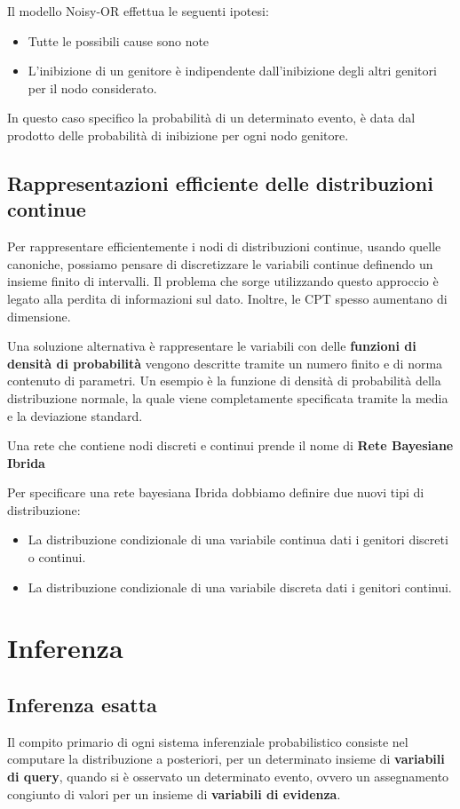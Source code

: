 Il modello Noisy-OR effettua le seguenti ipotesi:
\begin{itemize}
    \item Tutte le possibili cause sono note
    \item L'inibizione di un genitore è indipendente dall'inibizione degli altri
          genitori per il nodo considerato.
\end{itemize}
In questo caso specifico la probabilità di un determinato evento, è data dal
prodotto delle probabilità di inibizione per ogni nodo genitore.
\subsection{Rappresentazioni efficiente delle distribuzioni continue}
Per rappresentare efficientemente i nodi di distribuzioni continue, usando quelle
canoniche, possiamo pensare di discretizzare le variabili continue definendo un
insieme finito di intervalli. Il problema che sorge utilizzando questo approccio
è legato alla perdita di informazioni sul dato. Inoltre, le CPT spesso aumentano
di dimensione.

Una soluzione alternativa è rappresentare le variabili con delle \textbf{funzioni
    di densità di probabilità} vengono descritte tramite un numero finito e di
norma contenuto di parametri. Un esempio è la funzione di densità di probabilità
della distribuzione normale, la quale viene completamente specificata tramite
la media e la deviazione standard.
\begin{definizione}
    Una rete che contiene nodi discreti e continui prende il nome di \textbf{Rete
        Bayesiane Ibrida}
\end{definizione}
Per specificare una rete bayesiana Ibrida dobbiamo definire due nuovi tipi di
distribuzione:
\begin{itemize}
    \item La distribuzione condizionale di una variabile continua dati i genitori
          discreti o continui.
    \item La distribuzione condizionale di una variabile discreta dati i genitori
          continui.
\end{itemize}
\section{Inferenza}
\subsection{Inferenza esatta}
Il compito primario di ogni sistema inferenziale probabilistico consiste nel
computare la distribuzione a posteriori, per un determinato insieme di \textbf{variabili
    di query}, quando si è osservato un determinato evento, ovvero un assegnamento
congiunto di valori per un insieme di \textbf{variabili di evidenza}.

